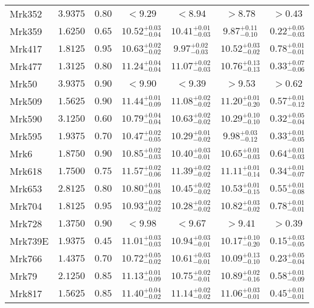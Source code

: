 \documentclass[onecolumn]{mn2e}
\begin{document}
{\begin{center}
\begin{longtable}{lcccccc}
Mrk352 & $3.9375$ & $0.80$ & $<9.29$ & $<8.94$ & $>8.78$ &$>0.43$ \\
Mrk359 & $1.6250$ & $0.65$ & $10.52_{-0.04}^{+0.03}$ & $10.41_{-0.03}^{+0.01}$ & $9.87_{-0.10}^{+0.11}$ &$0.22_{-0.03}^{+0.05}$ \\
Mrk417 & $1.8125$ & $0.95$ & $10.63_{-0.02}^{+0.02}$ & $9.97_{-0.03}^{+0.02}$ & $10.52_{-0.02}^{+0.03}$ &$0.78_{-0.01}^{+0.01}$ \\
Mrk477 & $1.3125$ & $0.80$ & $11.24_{-0.04}^{+0.04}$ & $11.07_{-0.03}^{+0.02}$ & $10.76_{-0.13}^{+0.13}$ &$0.33_{-0.06}^{+0.07}$ \\
Mrk50 & $3.9375$ & $0.90$ & $<9.90$ & $<9.39$ & $>9.53$ &$>0.62$ \\
Mrk509 & $1.5625$ & $0.90$ & $11.44_{-0.09}^{+0.01}$ & $11.08_{-0.02}^{+0.02}$ & $11.20_{-0.20}^{+0.01}$ &$0.57_{-0.12}^{+0.01}$ \\
Mrk590 & $3.1250$ & $0.60$ & $10.79_{-0.04}^{+0.04}$ & $10.63_{-0.02}^{+0.02}$ & $10.29_{-0.10}^{+0.10}$ &$0.32_{-0.04}^{+0.05}$ \\
Mrk595 & $1.9375$ & $0.70$ & $10.47_{-0.05}^{+0.02}$ & $10.29_{-0.02}^{+0.01}$ & $9.98_{-0.12}^{+0.03}$ &$0.33_{-0.05}^{+0.01}$ \\
Mrk6 & $1.8750$ & $0.90$ & $10.85_{-0.03}^{+0.02}$ & $10.40_{-0.01}^{+0.03}$ & $10.65_{-0.03}^{+0.01}$ &$0.64_{-0.03}^{+0.01}$ \\
Mrk618 & $1.7500$ & $0.75$ & $11.57_{-0.06}^{+0.02}$ & $11.39_{-0.02}^{+0.02}$ & $11.11_{-0.14}^{+0.01}$ &$0.34_{-0.07}^{+0.01}$ \\
Mrk653 & $2.8125$ & $0.80$ & $10.80_{-0.08}^{+0.01}$ & $10.45_{-0.02}^{+0.02}$ & $10.53_{-0.15}^{+0.01}$ &$0.55_{-0.08}^{+0.01}$ \\
Mrk704 & $1.8125$ & $0.95$ & $10.93_{-0.02}^{+0.02}$ & $10.28_{-0.02}^{+0.02}$ & $10.82_{-0.02}^{+0.03}$ &$0.78_{-0.01}^{+0.01}$ \\
Mrk728 & $1.3750$ & $0.90$ & $<9.98$ & $<9.67$ & $>9.41$ &$>0.39$ \\
Mrk739E & $1.9375$ & $0.45$ & $11.01_{-0.03}^{+0.03}$ & $10.94_{-0.01}^{+0.03}$ & $10.17_{-0.20}^{+0.10}$ &$0.15_{-0.05}^{+0.03}$ \\
Mrk766 & $1.4375$ & $0.70$ & $10.72_{-0.02}^{+0.05}$ & $10.61_{-0.01}^{+0.03}$ & $10.09_{-0.10}^{+0.13}$ &$0.23_{-0.04}^{+0.05}$ \\
Mrk79 & $2.1250$ & $0.85$ & $11.13_{-0.09}^{+0.01}$ & $10.75_{-0.01}^{+0.02}$ & $10.89_{-0.16}^{+0.02}$ &$0.58_{-0.09}^{+0.01}$ \\
Mrk817 & $1.5625$ & $0.85$ & $11.40_{-0.02}^{+0.04}$ & $11.14_{-0.02}^{+0.02}$ & $11.06_{-0.01}^{+0.03}$ &$0.45_{-0.01}^{+0.01}$ \\

\end{longtable}
\end{center}}
\end{document}
